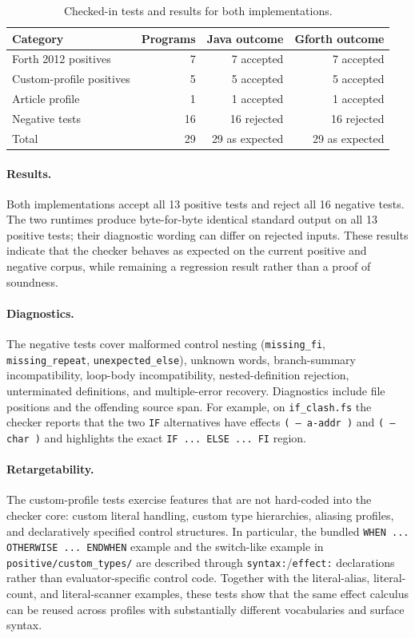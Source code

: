 \documentclass[acmsmall,screen,review,anonymous,nonacm]{acmart}
\begin{document}
\begin{table}[t]
\centering
\caption{Checked-in tests and results for both implementations.}
\label{tab:corpus-results}
\begin{tabular}{lrrr}
\hline
Category & Programs & Java outcome & Gforth outcome \\
\hline
Forth 2012 positives & 7 & 7 accepted & 7 accepted \\
Custom-profile positives & 5 & 5 accepted & 5 accepted \\
Article profile & 1 & 1 accepted & 1 accepted \\
Negative tests & 16 & 16 rejected & 16 rejected \\
\hline
Total & 29 & 29 as expected & 29 as expected \\
\hline
\end{tabular}
\end{table}

\paragraph{Results.}
Both implementations accept all 13 positive tests and reject all 16 negative tests.
The two runtimes produce byte-for-byte identical standard output on all 13 positive
tests; their diagnostic wording can differ on rejected inputs. These results indicate
that the checker behaves as expected on the current positive and negative corpus, while
remaining a regression result rather than a proof of soundness.

\paragraph{Diagnostics.}
The negative tests cover malformed control nesting (\texttt{missing\_fi},
\texttt{missing\_repeat}, \texttt{unexpected\_else}), unknown words, branch-summary
incompatibility, loop-body incompatibility, nested-definition rejection, unterminated
definitions, and multiple-error recovery. Diagnostics include file positions and the
offending source span. For example, on \texttt{if\_clash.fs} the checker reports that the
two \texttt{IF} alternatives have effects \texttt{( -- a-addr )} and
\texttt{( -- char )} and highlights the exact \texttt{IF ... ELSE ... FI} region.

\paragraph{Retargetability.}
The custom-profile tests exercise features that are not hard-coded into the checker core: custom literal handling, custom type hierarchies, aliasing profiles, and declaratively specified control structures. In particular, the bundled \texttt{WHEN ... OTHERWISE ... ENDWHEN} example and the switch-like example in \texttt{positive/custom\_types/} are described through \texttt{syntax:}/\texttt{effect:} declarations rather than evaluator-specific control code. Together with the literal-alias, literal-count, and literal-scanner examples, these tests show that the same effect calculus can be reused across profiles with substantially different vocabularies and surface syntax.
\end{document}
